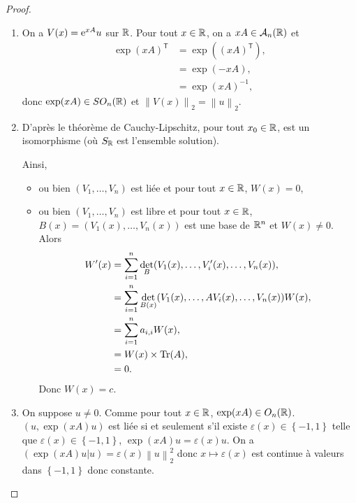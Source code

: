 \documentclass[12pt]{article}
\begin{document}
\begin{proof}
	\phantom{}
	\begin{enumerate}
		\item On a $V(x)=\mathrm{e}^{xA}u$ sur $\mathbb{R}$. Pour tout $x\in\mathbb{R}$, on a $xA\in\mathcal{A}_n(\mathbb{R})$ et 
		\begin{align*}
			\exp(xA)^{\mathsf{T}}
			&=\exp((xA)^{\mathsf{T}}),\\
			&=\exp(-xA),\\
			&=\exp(xA)^{-1},
		\end{align*}
		donc $\exp(xA)\in SO_n(\mathbb{R})$ et $\left\lVert V(x)\right\rVert_{2}=\left\lVert u\right\rVert_{2}$.

		\item D'après le théorème de Cauchy-Lipschitz, pour tout $x_0\in\mathbb{R}$,  est un isomorphisme (où $S_{\mathbb{R}}$ est l'ensemble solution).
		
		Ainsi,
		\begin{itemize}
			\item ou bien $(V_1,\dots,V_n)$ est liée et pour tout $x\in\mathbb{R}$, $W(x)=0$,
			\item ou bien $(V_1,\dots,V_n)$ est libre et pour tout $x\in\mathbb{R}$, $B(x)=(V_1(x),\dots,V_n(x))$ est une base de $\mathbb{R}^{n}$ et $W(x)\neq0$. Alors 
			\begin{align*}
				W'(x)
				&=\sum_{i=1}^{n}\det_{B}(V_1(x),\dots,V_i'(x),\dots,V_n(x)),\\
				&=\sum_{i=1}^{n}\det_{B(x)}(V_1(x),\dots,AV_i(x),\dots,V_n(x))W(x),\\
				&=\sum_{i=1}^{n}a_{i,i}W(x),\\
				&=W(x)\times\operatorname{Tr}(A),\\
				&=0.
			\end{align*}
			Donc $W(x)=c$.
		\end{itemize}

		\item On suppose $u\neq0$. Comme pour tout $x\in\mathbb{R}$, $\exp(xA)\in O_n(\mathbb{R})$. $(u,\exp(xA)u)$ est liée si et seulement s'il existe $\varepsilon(x)\in\left\lbrace-1,1\right\rbrace$ telle que $\varepsilon(x)\in\left\lbrace-1,1\right\rbrace$, $\exp(xA)u=\varepsilon(x)u$. On a $(\exp(xA)u|u)=\varepsilon(x)\left\lVert u\right\rVert_{2}^{2}$ donc $x\mapsto\varepsilon(x)$ est continue à valeurs dans $\left\lbrace-1,1\right\rbrace$ donc constante.
		

\end{enumerate}
\end{proof}
\end{document}
